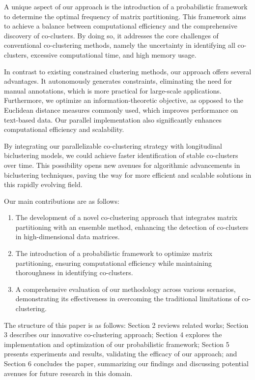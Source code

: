 A unique aspect of our approach is the introduction of a probabilistic framework to determine the optimal frequency of matrix partitioning. This framework aims to achieve a balance between computational efficiency and the comprehensive discovery of co-clusters. By doing so, it addresses the core challenges of conventional co-clustering methods, namely the uncertainty in identifying all co-clusters, excessive computational time, and high memory usage.

In contrast to existing constrained clustering methods, our approach offers several advantages. It autonomously generates constraints, eliminating the need for manual annotations, which is more practical for large-scale applications. Furthermore, we optimize an information-theoretic objective, as opposed to the Euclidean distance measures commonly used, which improves performance on text-based data. Our parallel implementation also significantly enhances computational efficiency and scalability.

By integrating our parallelizable co-clustering strategy with longitudinal biclustering models, we could achieve faster identification of stable co-clusters over time. This possibility opens new avenues for algorithmic advancements in biclustering techniques, paving the way for more efficient and scalable solutions in this rapidly evolving field.

Our main contributions are as follows:

\begin{enumerate}
    \item The development of a novel co-clustering approach that integrates matrix partitioning with an ensemble method, enhancing the detection of co-clusters in high-dimensional data matrices.
    \item The introduction of a probabilistic framework to optimize matrix partitioning, ensuring computational efficiency while maintaining thoroughness in identifying co-clusters.
    \item A comprehensive evaluation of our methodology across various scenarios, demonstrating its effectiveness in overcoming the traditional limitations of co-clustering.
\end{enumerate}

The structure of this paper is as follows: Section 2 reviews related works; Section 3 describes our innovative co-clustering approach; Section 4 explores the implementation and optimization of our probabilistic framework; Section 5 presents experiments and results, validating the efficacy of our approach; and Section 6 concludes the paper, summarizing our findings and discussing potential avenues for future research in this domain.

